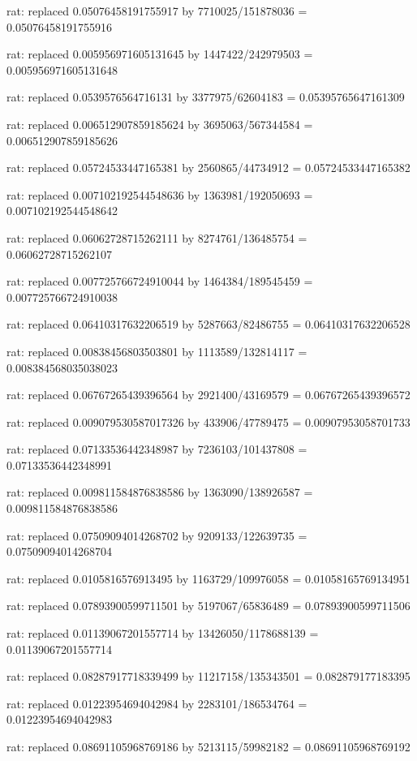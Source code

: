 \documentclass[a4paper,10pt]{article}
\begin{document}
\begin{eulernotebook}
\begin{eulercomment}
\begin{eulercomment}
\begin{eulercomment}
\begin{eulercomment}
\begin{eulercomment}
\begin{eulercomment}
\begin{eulercomment}
\begin{eulercomment}
\begin{eulercomment}
\begin{eulercomment}
\begin{eulercomment}
\begin{eulercomment}
\begin{eulercomment}
\begin{eulercomment}
\begin{eulercomment}
\begin{eulercomment}
\begin{euleroutput}
  rat: replaced 0.05076458191755917 by 7710025/151878036 = 0.05076458191755916
  
  rat: replaced 0.005956971605131645 by 1447422/242979503 = 0.005956971605131648
  
  rat: replaced 0.0539576564716131 by 3377975/62604183 = 0.05395765647161309
  
  rat: replaced 0.006512907859185624 by 3695063/567344584 = 0.006512907859185626
  
  rat: replaced 0.05724533447165381 by 2560865/44734912 = 0.05724533447165382
  
  rat: replaced 0.007102192544548636 by 1363981/192050693 = 0.007102192544548642
  
  rat: replaced 0.06062728715262111 by 8274761/136485754 = 0.06062728715262107
  
  rat: replaced 0.007725766724910044 by 1464384/189545459 = 0.007725766724910038
  
  rat: replaced 0.06410317632206519 by 5287663/82486755 = 0.06410317632206528
  
  rat: replaced 0.00838456803503801 by 1113589/132814117 = 0.008384568035038023
  
  rat: replaced 0.06767265439396564 by 2921400/43169579 = 0.06767265439396572
  
  rat: replaced 0.009079530587017326 by 433906/47789475 = 0.00907953058701733
  
  rat: replaced 0.07133536442348987 by 7236103/101437808 = 0.07133536442348991
  
  rat: replaced 0.009811584876838586 by 1363090/138926587 = 0.009811584876838586
  
  rat: replaced 0.07509094014268702 by 9209133/122639735 = 0.07509094014268704
  
  rat: replaced 0.0105816576913495 by 1163729/109976058 = 0.01058165769134951
  
  rat: replaced 0.07893900599711501 by 5197067/65836489 = 0.07893900599711506
  
  rat: replaced 0.01139067201557714 by 13426050/1178688139 = 0.01139067201557714
  
  rat: replaced 0.08287917718339499 by 11217158/135343501 = 0.082879177183395
  
  rat: replaced 0.01223954694042984 by 2283101/186534764 = 0.01223954694042983
  
  rat: replaced 0.08691105968769186 by 5213115/59982182 = 0.08691105968769192
  

\end{euleroutput}
\end{eulercomment}
\end{eulercomment}
\end{eulercomment}
\end{eulercomment}
\end{eulercomment}
\end{eulercomment}
\end{eulercomment}
\end{eulercomment}
\end{eulercomment}
\end{eulercomment}
\end{eulercomment}
\end{eulercomment}
\end{eulercomment}
\end{eulercomment}
\end{eulercomment}
\end{eulercomment}
\end{eulernotebook}
\end{document}
